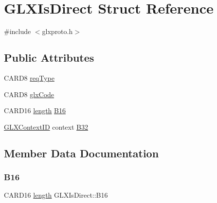 \hypertarget{struct_g_l_x_is_direct}{}\section{G\+L\+X\+Is\+Direct Struct Reference}
\label{struct_g_l_x_is_direct}


{\ttfamily \#include $<$glxproto.\+h$>$}

\subsection*{Public Attributes}
\begin{DoxyCompactItemize}
\item 
C\+A\+R\+D8 \hyperlink{struct_g_l_x_is_direct_a01c05b7e69d2894b5b8c52e544acd4af}{req\+Type}
\item 
C\+A\+R\+D8 \hyperlink{struct_g_l_x_is_direct_aadd8f7190c5dda50e7132f692ddcbcb2}{glx\+Code}
\item 
C\+A\+R\+D16 \hyperlink{glcorearb_8h_ab9c919755bde3b34349e23a32b4e0fa7}{length} \hyperlink{struct_g_l_x_is_direct_a7f332c78ec06c4247ca2292796c36f83}{B16}
\item 
\hyperlink{glx_8h_a17c7ca5b76cc448032df0b5352803005}{G\+L\+X\+Context\+ID} context \hyperlink{struct_g_l_x_is_direct_a1ea388bedeb9c643ccd59b4544e104f4}{B32}
\end{DoxyCompactItemize}


\subsection{Member Data Documentation}
\mbox{\label{struct_g_l_x_is_direct_a7f332c78ec06c4247ca2292796c36f83}} 
\subsubsection{\texorpdfstring{B16}{B16}}
{\footnotesize\ttfamily C\+A\+R\+D16 \hyperlink{glcorearb_8h_ab9c919755bde3b34349e23a32b4e0fa7}{length} G\+L\+X\+Is\+Direct\+::\+B16}

\mbox{\label{struct_g_l_x_is_direct_a1ea388bedeb9c643ccd59b4544e104f4}} 

